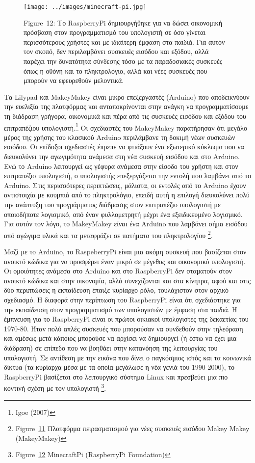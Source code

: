 \documentclass[
]{article}
\begin{document}
\leavevmode{}%
\begin{figure}
\hypertarget{fig:minecraft-pi}{%
\centering
\texttt{[image: ../images/minecraft-pi.jpg]}
\caption{Figure~12: Το RaspberryPi δημιουργήθηκε για να δώσει οικονομική
πρόσβαση στον προγραμματισμό του υπολογιστή σε όσο γίνεται περισσότερους
χρήστες και με ιδιαίτερη έμφαση στα παιδιά. Για αυτόν τον σκοπό, δεν
περιλαμβάνει συσκευές εισόδου και εξόδου, αλλά παρέχει την δυνατότητα
σύνδεσης τόσο με τα παραδοσιακές συσκευές όπως η οθόνη και το
πληκτρολόγιο, αλλά και νέες συσκευές που μπορούν να εφευρεθούν
μελοντικά.}\label{fig:minecraft-pi}
}
\end{figure}

Τα Lilypad και MakeyMakey είναι μικρο-επεξεργαστές (Arduino) που
αποδεικνύουν την ευελιξία της πλατφόρμας και ανταποκρίνονται στην ανάγκη
να προγραμματίσουμε τη διάδραση γρήγορα, οικονομικά και πέρα από τις
συσκευές εισόδου και εξόδου του επιτραπέζιου υπολογιστή.\footnote{Igoe
  (2007)} Οι σχεδιαστές του MakeyMakey παρατήρησαν ότι μεγάλο μέρος της
χρήσης του κλασικού Arduino περιλάμβανε τη δοκιμή νέων συσκευών εισόδου.
Οι επίδοξοι σχεδιαστές έπρεπε να φτιάξουν ένα εξωτερικό κύκλωμα που να
διευκολύνει την αγωγιμότητα ανάμεσα στη νέα συσκευή εισόδου και στο
Arduino. Ενώ το Arduino λειτουργεί ως γέφυρα ανάμεσα στην είσοδο του
χρήστη και στον επιτραπέζιο υπολογιστή, ο υπολογιστής επεξεργάζεται την
εντολή που λαμβάνει από το Arduino. Στις περισσότερες περιπτώσεις,
μάλιστα, οι εντολές από το Arduino έχουν αντιστοιχία με κουμπιά από το
πληκτρολόγιο, επειδή αυτή η επιλογή διευκολύνει πολύ την ανάπτυξη του
προγράμματος διάδρασης στον επιτραπέζιο υπολογιστή με οποιοδήποτε
λογισμικό, από έναν φυλλομετρητή μέχρι ένα εξειδικευμένο λογισμικό. Για
αυτόν τον λόγο, το MakeyMakey είναι ένα Arduino που λαμβάνει σήμα
εισόδου από αγώγιμα υλικά και τα μεταφράζει σε πατήματα του
πληκτρολογίου \footnote{Figure~\protect\hyperlink{fig:makey_makey_front}{11}
  Πλατφόρμα πειρασματισμού για νέες συσκευές εισόδου Makey Makey
  (MakeyMakey)}.

Μαζί με το Arduino, το RaspeberryPi είναι μια ακόμη συσκευή που
βασίζεται στον ανοικτό κώδικα για να προσφέρει έναν μικρό σε μέγεθος και
οικονομικό υπολογιστή. Οι ομοιότητες ανάμεσα στο Arduino και στο
RaspberryPi δεν σταματούν στον ανοικτό κώδικα και στην οικονομία, αλλά
συνεχίζονται και στα κίνητρα, αφού και στις δύο περιπτώσεις η εκπαίδευση
έπαιξε κυρίαρχο ρόλο, τουλάχιστον στον αρχικό σχεδιασμό. Η διαφορά στην
περίπτωση του RaspberryPi είναι ότι σχεδιάστηκε για την εκπαίδευση στον
προγραμματισμό των υπολογιστών με έμφαση στα παιδιά. Η έμπνευση για το
RaspberryPi είναι οι πρώτοι οικιακοί υπολογιστές της δεκαετίας του
1970-80. Ήταν πολύ απλές συσκευές που μπορούσαν να συνδεθούν στην
τηλεόραση και αμέσως μετά κάποιος μπορούσε να αρχίσει να δημιουργεί (ή
έστω να έχει μια διάδραση) σε επίπεδο που να βοηθάει στην κατανόηση της
λειτουργίας του υπολογιστή. Σε αντίθεση με την εικόνα που δίνει ο
παγκόσμιος ιστός και τα κοινωνικά δίκτυα (τα κυρίαρχα μέσα με τα οποία
μεγάλωσε η νέα γενιά του 1990-2000), το RaspberryPi βασίζεται στο
λειτουργικό σύστημα Linux και πρεσβεύει μια πιο κοντινή σχέση με τον
υπολογιστή \footnote{Figure~\protect\hyperlink{fig:minecraft-pi}{12}
  MinecraftPi (RaspberryPi Foundation)}.
\end{document}
